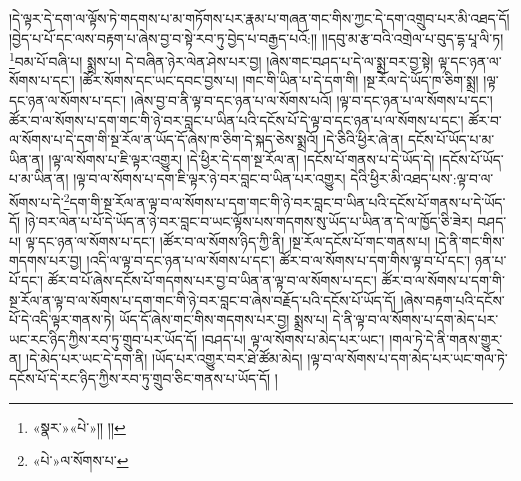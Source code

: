 །དེ་ལྟར་དེ་དག་ལ་ལྟོས་ཏེ་གདགས་པ་མ་གཏོགས་པར་རྣམ་པ་གཞན་གང་གིས་ཀྱང་དེ་དག་འགྲུབ་པར་མི་འཐད་དོ། །བྱེད་པ་པོ་དང་ལས་བརྟག་པ་ཞེས་བྱ་བ་སྟེ་རབ་ཏུ་བྱེད་པ་བརྒྱད་པའོ:།། །།དབུ་མ་རྩ་བའི་འགྲེལ་པ་བུད་དྷ་པཱ་ལི་ཏ། \footnote{«སྣར་»«པེ་»།། །། }བམ་པོ་བཞི་པ། སྨྲས་པ། དེ་བཞིན་ཉེར་ལེན་ཤེས་པར་བྱ། །ཞེས་གང་བཤད་པ་དེ་ལ་སྨྲ་བར་བྱ་སྟེ། ལྟ་དང་ཉན་ལ་སོགས་པ་དང་། །ཚོར་སོགས་དང་ཡང་དབང་བྱས་པ། །གང་གི་ཡིན་པ་དེ་དག་གི། །སྔ་རོལ་དེ་ཡོད་ཁ་ཅིག་སྨྲ། །ལྟ་དང་ཉན་ལ་སོགས་པ་དང་། །ཞེས་བྱ་བ་ནི་ལྟ་བ་དང་ཉན་པ་ལ་སོགས་པའོ། །ལྟ་བ་དང་ཉན་པ་ལ་སོགས་པ་དང་། ཚོར་བ་ལ་སོགས་པ་དག་གང་གི་ཉེ་བར་བླང་པ་ཡིན་པའི་དངོས་པོ་དེ་ལྟ་བ་དང་ཉན་པ་ལ་སོགས་པ་དང་། ཚོར་བ་ལ་སོགས་པ་དེ་དག་གི་སྔ་རོལ་ན་ཡོད་དོ་ཞེས་ཁ་ཅིག་དེ་སྐད་ཅེས་སྨྲའོ། །དེ་ཅིའི་ཕྱིར་ཞེ་ན། དངོས་པོ་ཡོད་པ་མ་ཡིན་ན། །ལྟ་ལ་སོགས་པ་ཇི་ལྟར་འགྱུར། །དེ་ཕྱིར་དེ་དག་སྔ་རོལ་ན། །དངོས་པོ་གནས་པ་དེ་ཡོད་དེ། །དངོས་པོ་ཡོད་པ་མ་ཡིན་ན། །ལྟ་བ་ལ་སོགས་པ་དག་ཇི་ལྟར་ཉེ་བར་བླང་བ་ཡིན་པར་འགྱུར། དེའི་ཕྱིར་མི་འཐད་པས་:ལྟ་བ་ལ་སོགས་པ་དེ་\footnote{«པེ་»ལ་སོགས་པ་}དག་གི་སྔ་རོལ་ན་ལྟ་བ་ལ་སོགས་པ་དག་གང་གི་ཉེ་བར་བླང་བ་ཡིན་པའི་དངོས་པོ་གནས་པ་དེ་ཡོད་དོ། །ཉེ་བར་ལེན་པ་པོ་དེ་ཡོད་ན་ཉེ་བར་བླང་བ་ཡང་ལྟོས་པས་གདགས་སུ་ཡོད་པ་ཡིན་ན་དེ་ལ་ཁྱོད་ཅི་ཟེར། བཤད་པ། ལྟ་དང་ཉན་ལ་སོགས་པ་དང་། །ཚོར་བ་ལ་སོགས་ཉིད་ཀྱི་ནི། །སྔ་རོལ་དངོས་པོ་གང་གནས་པ། །དེ་ནི་གང་གིས་གདགས་པར་བྱ། །འདི་ལ་ལྟ་བ་དང་ཉན་པ་ལ་སོགས་པ་དང་། ཚོར་བ་ལ་སོགས་པ་དག་གིས་ལྟ་བ་པོ་དང་། ཉན་པ་པོ་དང་། ཚོར་བ་པོ་ཞེས་དངོས་པོ་གདགས་པར་བྱ་བ་ཡིན་ན་ལྟ་བ་ལ་སོགས་པ་དང་། ཚོར་བ་ལ་སོགས་པ་དག་གི་སྔ་རོལ་ན་ལྟ་བ་ལ་སོགས་པ་དག་གང་གི་ཉེ་བར་བླང་བ་ཞེས་བརྗོད་པའི་དངོས་པོ་ཡོད་དོ། །ཞེས་བརྟག་པའི་དངོས་པོ་དེ་འདི་ལྟར་གནས་ཏེ། ཡོད་དོ་ཞེས་གང་གིས་གདགས་པར་བྱ། སྨྲས་པ། དེ་ནི་ལྟ་བ་ལ་སོགས་པ་དག་མེད་པར་ཡང་རང་ཉིད་ཀྱིས་རབ་ཏུ་གྲུབ་པར་ཡོད་དོ། །བཤད་པ། ལྟ་ལ་སོགས་པ་མེད་པར་ཡང་། །གལ་ཏེ་དེ་ནི་གནས་གྱུར་ན། །དེ་མེད་པར་ཡང་དེ་དག་ནི། །ཡོད་པར་འགྱུར་བར་ཐེ་ཚོམ་མེད། །ལྟ་བ་ལ་སོགས་པ་དག་མེད་པར་ཡང་གལ་ཏེ་དངོས་པོ་དེ་རང་ཉིད་ཀྱིས་རབ་ཏུ་གྲུབ་ཅིང་གནས་པ་ཡོད་དོ། །
